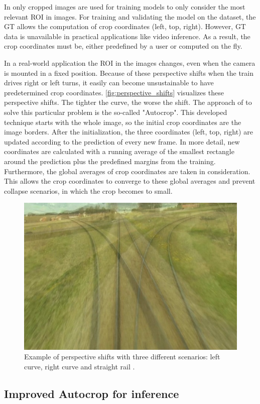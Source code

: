 In \cite{tepNet2024} only cropped images are used for training models to only consider the most relevant \ac{ROI} in images.
For training and validating the model on the dataset, the \ac{GT} allows the computation of crop coordinates (left, top, right).
However, \ac{GT} data is unavailable in practical applications like video inference.
As a result, the crop coordinates must be, either predefined by a user or computed on the fly.

In a real-world application the ROI in the images changes, even when the camera is mounted in a fixed position.
Because of these perspective shifts when the train drives right or left turns, it easily can become unsustainable to have predetermined crop coordinates.
\autoref{fig:perspective_shifts} visualizes these perspective shifts.
The tighter the curve, the worse the shift.
The approach of \cite{tepNet2024} to solve this particular problem is the so-called "Autocrop".
This developed technique starts with the whole image, so the initial crop coordinates are the image borders.
After the initialization, the three coordinates (left, top, right) are updated according to the prediction of every new frame.
In more detail, new coordinates are calculated with a running average of the smallest rectangle around the prediction plus the predefined margins from the training.
Furthermore, the global averages of crop coordinates are taken in consideration.
This allows the crop coordinates to converge to these global averages and prevent collapse scenarios, in which the crop becomes to small.


\begin{figure}[H]
    \centering
    \includegraphics[width=0.6\linewidth]{PICs/Baselinepaper/perspective_shifts.jpg}
    \caption{Example of perspective shifts with three different scenarios: left curve, right curve and straight rail \cite{tepNet2024}.}
    \label{fig:perspective_shifts}
\end{figure}

\subsection{Improved Autocrop for inference}
\label{sec:imporvedAutocrop}

